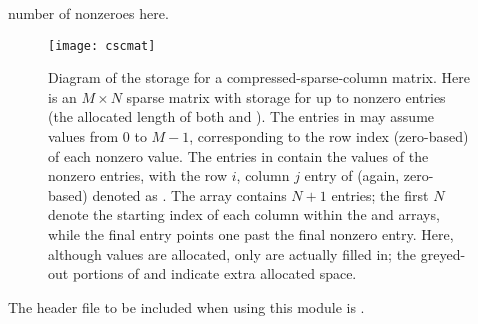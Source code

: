 number of nonzeroes here.
\begin{figure}
\centerline{\texttt{[image: cscmat]}}
\caption[Diagram of the storage for a compressed-sparse-column matrix] 
  {Diagram of the storage for a compressed-sparse-column
  matrix. Here  is an $M \times N$ sparse matrix with storage
  for up to  nonzero entries (the allocated length of
  both  and ).  The entries in 
  may assume values from $0$ to $M-1$, corresponding to the row index
  (zero-based) of each nonzero value.  The entries in  contain
  the values of the nonzero entries, with the row $i$, column $j$
  entry of  (again, zero-based) denoted as .
  The  array contains $N+1$ entries; the first $N$
  denote the starting index of each column within the 
  and  arrays, while the final entry points one past the
  final nonzero entry.  Here, although  values are allocated,
  only  are actually filled in; the greyed-out portions
  of  and  indicate extra allocated
  space.}\label{f:cscmat} 
\end{figure}

\noindent The header file to be included when using this module 
is . \\

